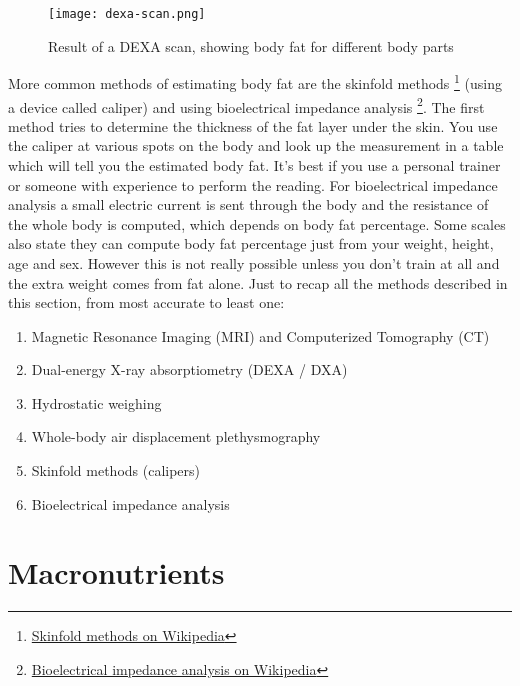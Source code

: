 \documentclass[openany, 12pt]{book}
\begin{document}
	\begin{figure}[h]
		\centering
		\texttt{[image: dexa-scan.png]}
		\caption{Result of a DEXA scan, showing body fat for different body parts}
                \label{dexa}
	\end{figure}
	
	More common methods of estimating body fat are the skinfold methods
        \footnote{\href{https://en.wikipedia.org/wiki/Body_fat_percentage\#Anthropometric_methods}{Skinfold methods on Wikipedia}}
        (using a device called caliper) and using bioelectrical impedance analysis
        \footnote{\href{https://en.wikipedia.org/wiki/Bioelectrical_impedance_analysis}{Bioelectrical impedance analysis on Wikipedia}}.
        The first method tries to determine the thickness of the fat layer under the skin. You use the caliper at various spots on the body and look up the measurement in
        a table which will tell you the estimated body fat. It's best if you use a personal trainer or someone with experience to perform the reading. For bioelectrical impedance analysis a small
        electric current is sent through the body and the resistance of the whole body is computed, which depends on body fat percentage. Some scales also state they can compute body fat percentage
        just from your weight, height, age and sex. However this is not really possible unless you don't train at all and the extra weight comes from fat alone. Just to recap all the methods
        described in this section, from most accurate to least one:
	
	\begin{enumerate}
		\item Magnetic Resonance Imaging (MRI) and Computerized Tomography (CT)
		\item Dual-energy X-ray absorptiometry (DEXA / DXA)
		\item Hydrostatic weighing
		\item Whole-body air displacement plethysmography
		\item Skinfold methods (calipers)
		\item Bioelectrical impedance analysis
	\end{enumerate}
	
	\section{Macronutrients}
	
\end{document}
